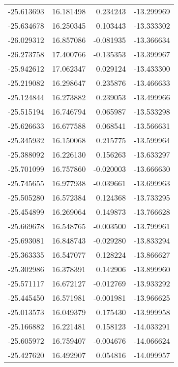 \begin{tabular}{rrrr}
      -25.613693 &        16.181498 &    0.234243 & -13.299969 \\
      -25.634678 &        16.250345 &    0.103443 & -13.333302 \\
      -26.029312 &        16.857086 &   -0.081935 & -13.366634 \\
      -26.273758 &        17.400766 &   -0.135353 & -13.399967 \\
      -25.942612 &        17.062347 &    0.029124 & -13.433300 \\
      -25.219082 &        16.298647 &    0.235876 & -13.466633 \\
      -25.124844 &        16.273882 &    0.239053 & -13.499966 \\
      -25.515194 &        16.746794 &    0.065987 & -13.533298 \\
      -25.626633 &        16.677588 &    0.068541 & -13.566631 \\
      -25.345932 &        16.150068 &    0.215775 & -13.599964 \\
      -25.388092 &        16.226130 &    0.156263 & -13.633297 \\
      -25.701099 &        16.757860 &   -0.020003 & -13.666630 \\
      -25.745655 &        16.977938 &   -0.039661 & -13.699963 \\
      -25.505280 &        16.572384 &    0.124368 & -13.733295 \\
      -25.454899 &        16.269064 &    0.149873 & -13.766628 \\
      -25.669678 &        16.548765 &   -0.003500 & -13.799961 \\
      -25.693081 &        16.848743 &   -0.029280 & -13.833294 \\
      -25.363335 &        16.547077 &    0.128224 & -13.866627 \\
      -25.302986 &        16.378391 &    0.142906 & -13.899960 \\
      -25.571117 &        16.672127 &   -0.012769 & -13.933292 \\
      -25.445450 &        16.571981 &   -0.001981 & -13.966625 \\
      -25.013573 &        16.049379 &    0.175430 & -13.999958 \\
      -25.166882 &        16.221481 &    0.158123 & -14.033291 \\
      -25.605972 &        16.759407 &   -0.004676 & -14.066624 \\
      -25.427620 &        16.492907 &    0.054816 & -14.099957 \\

\end{tabular}
